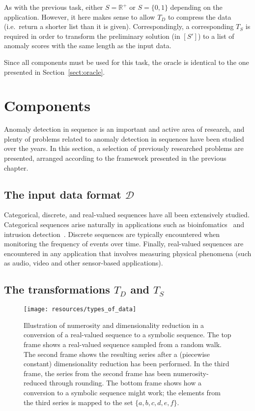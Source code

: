 As with the previous task, either $S = \mathbb{R}^+$ or $S = \{0, 1\}$ depending on the application. However, it here makes sense to allow $T_D$ to compress the data (i.e.\ return a shorter list than it is given). Correspondingly, a corresponding $T_S$ is required in order to transform the preliminary solution (in $[S']$) to a list of anomaly scores with the same length as the input data.

Since all components must be used for this task, the oracle is identical to the one presented in Section~\ref{sect:oracle}.

\section{Components}
\label{sect:prev_research}

Anomaly detection in sequence is an important and active area of research, and plenty of problems related to anomaly detection in sequences have been studied over the years. In this section, a selection of previously researched problems are presented, arranged according to the framework presented in the previous chapter.

\subsection{The input data format $\mathcal{D}$}

Categorical, discrete, and real-valued sequences have all been extensively studied. Categorical sequences arise naturally in applications such as bioinfomatics~\cite{TODO} and intrusion detection~\cite{TODO}. Discrete sequences are typically encountered when monitoring the frequency of events over time. Finally, real-valued sequences are encountered in any application that involves measuring physical phenomena (such as audio, video and other sensor-based applications).

\subsection{The transformations $T_D$ and $T_S$}

\begin{figure}[htb]
  \begin{center}
    \leavevmode
    \texttt{[image: resources/types\_of\_data]}
  \end{center}
  \caption{\small{Illustration of numerosity and dimensionality reduction in a conversion of a real-valued sequence to a symbolic sequence. The top frame shows a real-valued sequence sampled from a random walk. The second frame shows the resulting series after a (piecewise constant) dimensionality reduction has been performed. In the third frame, the series from the second frame has been numerosity-reduced through rounding. The bottom frame shows how a conversion to a symbolic sequence might work; the elements from the third series is mapped to the set $\{a,b,c,d,e,f\}$.}}
\label{fig:types_of_data}
\end{figure}

